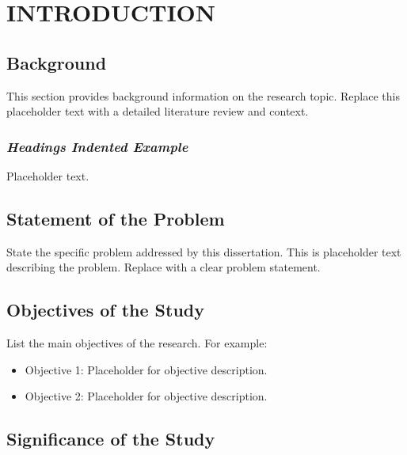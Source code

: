 \chapter{INTRODUCTION}

\section{Background}
This section provides background information on the research topic. Replace this placeholder text with a detailed literature review and context.


\subsection[Headings Indented Example]{\textit{Headings Indented Example}}
Placeholder text.
\section{Statement of the Problem}
State the specific problem addressed by this dissertation. This is placeholder text describing the problem. Replace with a clear problem statement.
\section{Objectives of the Study}
List the main objectives of the research. For example:
\begin{itemize}
  \item Objective 1: Placeholder for objective description.
  \item Objective 2: Placeholder for objective description.
\end{itemize}
\section{Significance of the Study}

